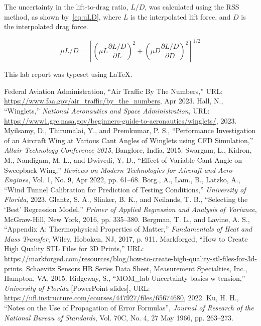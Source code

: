 \documentclass[journal,letterpaper]{IEEEtran}
\begin{document}
\pagebreak
The uncertainty in the lift-to-drag ratio, $L/D$, was calculated using the RSS method, as shown by~\eqref{eq:uLD}, where $L$ is the interpolated lift force, and $D$ is the interpolated drag force.

\begin{equation} \label{eq:uLD}
    \mu L/D = \left[\left(\mu L \frac{\partial L/D}{\partial L}\right)^2 + \left(\mu D \frac{\partial L/D}{\partial D}\right)^2\right]^{1/2}
\end{equation}

This lab report was typeset using \LaTeX.

\begin{thebibliography}{99}
     Federal Aviation Administration, ``Air Traffic By The Numbers,'' URL: \url{https://www.faa.gov/air_traffic/by_the_numbers}, Apr 2023.
     Hall, N., ``Winglets,'' \textit{National Aeronautics and Space Administration}, URL: \url{https://www1.grc.nasa.gov/beginners-guide-to-aeronautics/winglets/}, 2023.
     Myilsamy, D., Thirumalai, Y., and Premkumar, P. S., ``Performance Investigation of an Aircraft Wing at Various Cant Angles of Winglets using CFD Simulation,'' \textit{Altair Technology Conference 2015}, Banglore, India, 2015.
     Swargam, L., Kidron, M., Nandigam, M. L., and Dwivedi, Y. D., ``Effect of Variable Cant Angle on Sweepback Wing,'' \textit{Reviews on Modern Technologies for Aircraft and Aero-Engines}, Vol. 1, No. 9, Apr 2022, pp. 61--68.
     Borg., A., Lam., B., Latzko, A., ``Wind Tunnel Calibration for Prediction of Testing Conditions,'' \textit{University of Florida}, 2023.
     Glantz, S. A., Slinker, B. K., and Neilands, T. B., ``Selecting the `Best' Regression Model,'' \textit{Primer of Applied Regression and Analysis of Variance}, McGraw-Hill, New York, 2016, pp. 335--380.
     Bergman, T. L., and Lavine, A. S., ``Appendix A: Thermophysical Properties of Matter,'' \textit{Fundamentals of Heat and Mass Transfer}, Wiley, Hoboken, NJ, 2017, p. 911.
     Markforged, ``How to Create High Quality STL Files for 3D Prints,'' URL: \url{https://markforged.com/resources/blog/how-to-create-high-quality-stl-files-for-3d-prints}.
     Schaevitz Sensors HR Series Data Sheet, Measurement Specialties, Inc., Hampton, VA, 2015.
     Ridgeway, S., ``MOM\_lab Uncertainty basics w tension,'' \textit{University of Florida} [PowerPoint slides], URL: \url{https://ufl.instructure.com/courses/447927/files/65674680}, 2022.
     Ku, H. H., ``Notes on the Use of Propagation of Error Formulas'', \textit{Journal of Research of the National Bureau of Standards}, Vol. 70C, No. 4, 27 May 1966, pp. 263--273.
\end{thebibliography}
\end{document}
